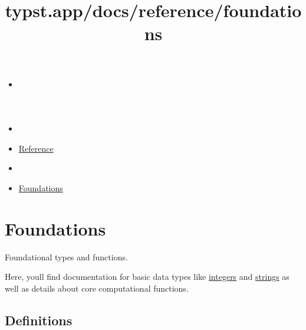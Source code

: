 \title{typst.app/docs/reference/foundations}

\begin{itemize}
\tightlist
\item
  \href{/docs}{}
\item
  
\item
  \href{/docs/reference/}{Reference}
\item
  
\item
  \href{/docs/reference/foundations/}{Foundations}
\end{itemize}

\section{Foundations}\label{summary}

Foundational types and functions.

Here, you\textquotesingle ll find documentation for basic data types
like \href{/docs/reference/foundations/int/}{integers} and
\href{/docs/reference/foundations/str/}{strings} as well as details
about core computational functions.

\subsection{Definitions}\label{definitions}

